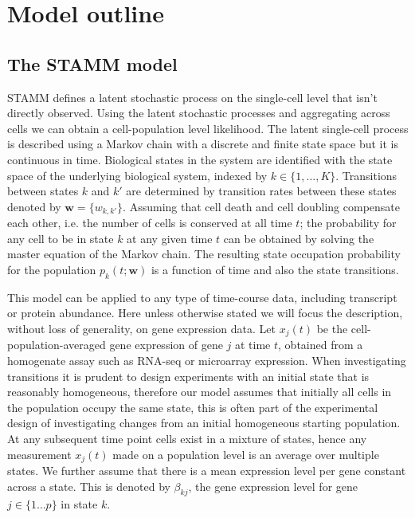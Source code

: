 \section{Model outline}
\label{sec:method}

\subsection{The STAMM model}
\label{sec:mast-model}


STAMM defines a latent stochastic process on the single-cell level that isn't directly observed. Using the latent stochastic processes and aggregating across cells we can obtain a cell-population level likelihood. The latent single-cell process is described using a Markov chain with a discrete and finite state space but it is continuous in time. Biological states in the system are identified with the state space of the underlying biological system, indexed by $k \in \lbrace 1, ..., K \rbrace$. Transitions between states $k$ and $k'$ are determined by transition rates between these states denoted by $\mathbf{w} = \lbrace w_{k,k'} \rbrace $. Assuming that cell death and cell doubling compensate each other, i.e. the number of cells is conserved at all time $t$; the probability for any cell to be in state $k$ at any given time $t$ can be obtained by solving the master equation of the Markov chain. The resulting state occupation probability for the population $p_k(t;\mathbf{w})$ is a function of time and also the state transitions.

This model can be applied to any type of time-course data, including transcript or protein abundance. Here unless otherwise stated we will focus the description, without loss of generality, on gene expression data. Let $x_j(t)$ be the cell-population-averaged gene expression of gene $j$ at time $t$, obtained from a homogenate assay such as RNA-seq or microarray expression. When investigating transitions it is prudent to design experiments with an initial state that is reasonably homogeneous, therefore our model assumes that initially all cells in the population occupy the same state, this is often part of the experimental design of investigating changes from an initial homogeneous starting population. At any subsequent time point cells exist in a mixture of states, hence any measurement $x_j(t)$ made on a population level is an average over multiple states. We further assume that there is a mean expression level per gene constant across a state. This is denoted by $\beta_{kj}$, the gene expression level for gene $j \in \lbrace 1 \ldots p \rbrace$ in state $k$.

